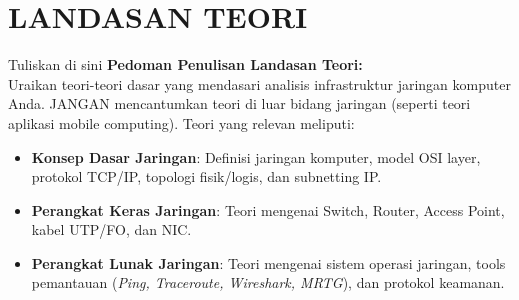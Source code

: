\chapter{LANDASAN TEORI}


Tuliskan di sini \textbf{Pedoman Penulisan Landasan Teori:} \\
Uraikan teori-teori dasar yang mendasari analisis infrastruktur jaringan komputer Anda. JANGAN mencantumkan teori di luar bidang jaringan (seperti teori aplikasi mobile computing). Teori yang relevan meliputi:
\begin{itemize}
    \item \textbf{Konsep Dasar Jaringan}: Definisi jaringan komputer, model OSI layer, protokol TCP/IP, topologi fisik/logis, dan subnetting IP.
    \item \textbf{Perangkat Keras Jaringan}: Teori mengenai Switch, Router, Access Point, kabel UTP/FO, dan NIC.
    \item \textbf{Perangkat Lunak Jaringan}: Teori mengenai sistem operasi jaringan, tools pemantauan (\textit{Ping, Traceroute, Wireshark, MRTG}), dan protokol keamanan.
\end{itemize}


